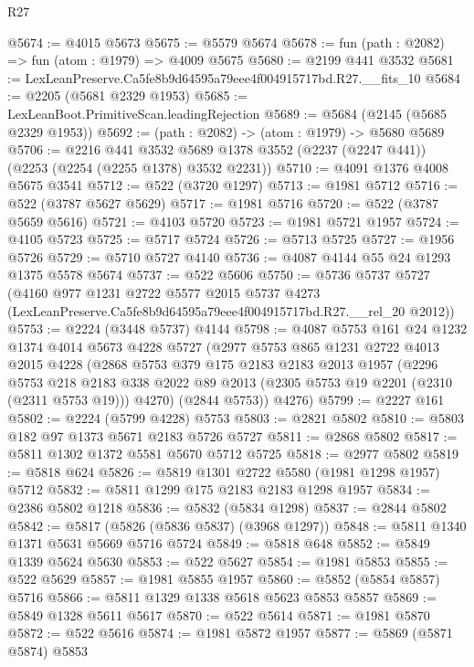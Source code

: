 \begin{lexlean}{R27}
\begin{coremodule}
@5674 := @4015 @5673
@5675 := @5579 @5674
@5678 := fun (path : @2082) => fun (atom : @1979) => @4009 @5675
@5680 := @2199 @441 @3532
@5681 := LexLeanPreserve.Ca5fe8b9d64595a79eee4f004915717bd.R27.__fits_10
@5684 := @2205 (@5681 @2329 @1953)
@5685 := LexLeanBoot.PrimitiveScan.leadingRejection
@5689 := @5684 (@2145 (@5685 @2329 @1953))
@5692 := (path : @2082) -> (atom : @1979) -> @5680 @5689
@5706 := @2216
    @441
    @3532
    @5689
    @1378
    @3552
    (@2237 (@2247 @441))
    (@2253 (@2254 (@2255 @1378) @3532 @2231))
@5710 := @4091 @1376 @4008 @5675 @3541
@5712 := @522 (@3720 @1297)
@5713 := @1981 @5712
@5716 := @522 (@3787 @5627 @5629)
@5717 := @1981 @5716
@5720 := @522 (@3787 @5659 @5616)
@5721 := @4103 @5720
@5723 := @1981 @5721 @1957
@5724 := @4105 @5723
@5725 := @5717 @5724
@5726 := @5713 @5725
@5727 := @1956 @5726
@5729 := @5710 @5727 @4140
@5736 := @4087 @4144 @55 @24 @1293 @1375 @5578 @5674
@5737 := @522 @5606
@5750 := @5736
    @5737
    @5727
    (@4160
      @977
      @1231
      @2722
      @5577
      @2015
      @5737
      @4273
      (LexLeanPreserve.Ca5fe8b9d64595a79eee4f004915717bd.R27.__rel_20 @2012))
@5753 := @2224 (@3448 @5737) @4144
@5798 := @4087
    @5753
    @161
    @24
    @1232
    @1374
    @4014
    @5673
    @4228
    @5727
    (@2977
      @5753
      @865
      @1231
      @2722
      @4013
      @2015
      @4228
      (@2868
        @5753
        @379
        @175
        @2183
        @2183
        @2013
        @1957
        (@2296
          @5753
          @218
          @2183
          @338
          @2022
          @89
          @2013
          (@2305 @5753 @19 @2201 (@2310 (@2311 @5753 @19)))
          @4270)
        (@2844 @5753))
      @4276)
@5799 := @2227 @161
@5802 := @2224 (@5799 @4228) @5753
@5803 := @2821 @5802
@5810 := @5803 @182 @97 @1373 @5671 @2183 @5726 @5727
@5811 := @2868 @5802
@5817 := @5811 @1302 @1372 @5581 @5670 @5712 @5725
@5818 := @2977 @5802
@5819 := @5818 @624
@5826 := @5819 @1301 @2722 @5580 (@1981 @1298 @1957) @5712
@5832 := @5811 @1299 @175 @2183 @2183 @1298 @1957
@5834 := @2386 @5802 @1218
@5836 := @5832 (@5834 @1298)
@5837 := @2844 @5802
@5842 := @5817 (@5826 (@5836 @5837) (@3968 @1297))
@5848 := @5811 @1340 @1371 @5631 @5669 @5716 @5724
@5849 := @5818 @648
@5852 := @5849 @1339 @5624 @5630
@5853 := @522 @5627
@5854 := @1981 @5853
@5855 := @522 @5629
@5857 := @1981 @5855 @1957
@5860 := @5852 (@5854 @5857) @5716
@5866 := @5811 @1329 @1338 @5618 @5623 @5853 @5857
@5869 := @5849 @1328 @5611 @5617
@5870 := @522 @5614
@5871 := @1981 @5870
@5872 := @522 @5616
@5874 := @1981 @5872 @1957
@5877 := @5869 (@5871 @5874) @5853

\end{coremodule}
\end{lexlean}
